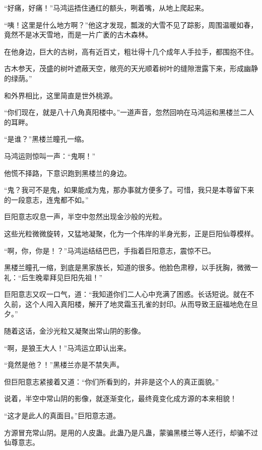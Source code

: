 
\begin{this_body}



“好痛，好痛！”马鸿运捂住通红的额头，咧着嘴，从地上爬起来。

“咦！这里是什么地方啊？”他这才发现，瓢泼的大雪不见了踪影，周围温暖如春，竟然不是冰天雪地，而是一片广袤的古木森林。

在他身边，巨大的古树，高有近百丈，粗壮得十几个成年人手拉手，都围抱不住。

古木参天，茂盛的树叶遮蔽天空，敞亮的天光顺着树叶的缝隙泄露下来，形成幽静的绿荫。”

和外界相比，这里简直是世外桃源。

“你们现在，就是八十八角真阳楼中。”一道声音，忽然回响在马鸿运和黑楼兰二人的耳畔。

“是谁？”黑楼兰瞳孔一缩。

马鸿运则惊叫一声：“鬼啊！”

他慌不择路，下意识跑到黑楼兰的身边。

“鬼？我可不是鬼，如果能成为鬼，那办事就方便多了。可惜，我只是本尊留下来的一段意志，连鬼都不如。”

巨阳意志叹息一声，半空中忽然出现金沙般的光粒。

这些光粒微微旋转，又猛地凝聚，化为一个伟岸的半身光影，正是巨阳仙尊模样。

“啊，你，你是！？”马鸿运结结巴巴，手指着巨阳意志，震惊不已。

黑楼兰瞳孔一缩，到底是黑家族长，知道的很多。他脸色肃穆，以手抚胸，微微一礼：“后生晚辈拜见巨阳先祖！”

巨阳意志又叹一口气，道：“我知道你们二人心中充满了困惑。长话短说。就在不久前，这个人闯入真阳楼，解开了地灵霜玉孔雀的封印。从而导致王庭福地危在旦夕。”

随着这话，金沙光粒又凝聚出常山阴的影像。

“啊，是狼王大人！”马鸿运立即认出来。

“竟然是他？！”黑楼兰亦是不禁失声。

但巨阳意志紧接着又道：“你们所看到的，并非是这个人的真正面貌。”

说着，半空中常山阴的影像，就逐渐变化，最终竟变化成方源的本来相貌！

“这才是此人的真面目。”巨阳意志道。

方源冒充常山阴。是用的人皮蛊。此蛊乃是凡蛊，蒙骗黑楼兰等人还行，却骗不过仙尊意志。


\end{this_body}
